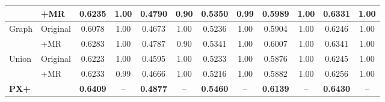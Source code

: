 \begin{table}[htbp]
{\begin{tabular}{llcccccccccc}
 & +MR & 0.6235 & 1.00 & 0.4790 & 0.90 & 0.5350 & 0.99 & 0.5989 & 1.00 & 0.6331 & 1.00 \\
\midrule
\multirow{2}{*}{Graph \cite{jordan2025crossover}} & Original & 0.6078 & 1.00 & 0.4673 & 1.00 & 0.5236 & 1.00 & 0.5904 & 1.00 & 0.6246 & 1.00 \\
 & +MR & 0.6283 & 1.00 & 0.4787 & 0.90 & 0.5341 & 1.00 & 0.6007 & 1.00 & 0.6341 & 1.00 \\
\midrule
\multirow{2}{*}{Union \cite{alp2003efficient}} & Original & 0.6223 & 1.00 & 0.4595 & 1.00 & 0.5233 & 1.00 & 0.5876 & 1.00 & 0.6245 & 1.00 \\
 & +MR & 0.6233 & 0.99 & 0.4666 & 1.00 & 0.5216 & 1.00 & 0.5882 & 1.00 & 0.6256 & 1.00 \\
\midrule
\textbf{PX+} & & \textbf{0.6409} & -- & \textbf{0.4877} & -- & \textbf{0.5460} & -- & \textbf{0.6139} & -- & \textbf{0.6430} & -- \\
\bottomrule
\end{tabular}}
\end{table}
